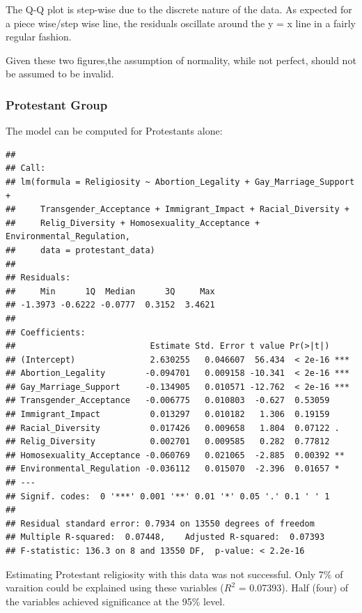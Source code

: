 \documentclass[
]{article}
\begin{document}
The Q-Q plot is step-wise due to the discrete nature of the data. As
expected for a piece wise/step wise line, the residuals oscillate around
the y = x line in a fairly regular fashion.

Given these two figures,the assumption of normality, while not perfect,
should not be assumed to be invalid.

\subsubsection{Protestant Group}\label{protestant-group-1}

The model can be computed for Protestants alone:

\begin{verbatim}
## 
## Call:
## lm(formula = Religiosity ~ Abortion_Legality + Gay_Marriage_Support + 
##     Transgender_Acceptance + Immigrant_Impact + Racial_Diversity + 
##     Relig_Diversity + Homosexuality_Acceptance + Environmental_Regulation, 
##     data = protestant_data)
## 
## Residuals:
##     Min      1Q  Median      3Q     Max 
## -1.3973 -0.6222 -0.0777  0.3152  3.4621 
## 
## Coefficients:
##                           Estimate Std. Error t value Pr(>|t|)    
## (Intercept)               2.630255   0.046607  56.434  < 2e-16 ***
## Abortion_Legality        -0.094701   0.009158 -10.341  < 2e-16 ***
## Gay_Marriage_Support     -0.134905   0.010571 -12.762  < 2e-16 ***
## Transgender_Acceptance   -0.006775   0.010803  -0.627  0.53059    
## Immigrant_Impact          0.013297   0.010182   1.306  0.19159    
## Racial_Diversity          0.017426   0.009658   1.804  0.07122 .  
## Relig_Diversity           0.002701   0.009585   0.282  0.77812    
## Homosexuality_Acceptance -0.060769   0.021065  -2.885  0.00392 ** 
## Environmental_Regulation -0.036112   0.015070  -2.396  0.01657 *  
## ---
## Signif. codes:  0 '***' 0.001 '**' 0.01 '*' 0.05 '.' 0.1 ' ' 1
## 
## Residual standard error: 0.7934 on 13550 degrees of freedom
## Multiple R-squared:  0.07448,    Adjusted R-squared:  0.07393 
## F-statistic: 136.3 on 8 and 13550 DF,  p-value: < 2.2e-16
\end{verbatim}

Estimating Protestant religiosity with this data was not successful.
Only 7\% of varaition could be explained using these variables (\(R^2\)
= 0.07393). Half (four) of the variables achieved significance at the
95\% level.
\end{document}
